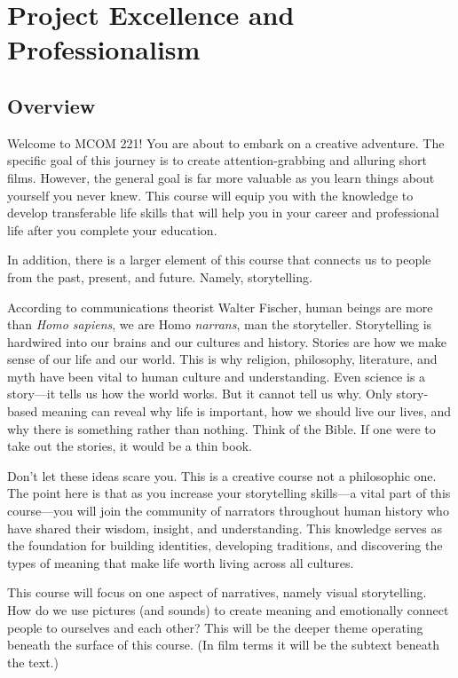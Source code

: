 \documentclass[
]{book}
\begin{document}
\hypertarget{project-excellence-and-professionalism}{%
\chapter{Project Excellence and Professionalism}\label{project-excellence-and-professionalism}}

\hypertarget{overview}{%
\section*{Overview}\label{overview}}

Welcome to MCOM 221! You are about to embark on a creative adventure. The specific goal of this journey is to create attention-grabbing and alluring short films. However, the general goal is far more valuable as you learn things about yourself you never knew. This course will equip you with the knowledge to develop transferable life skills that will help you in your career and professional life after you complete your education.

In addition, there is a larger element of this course that connects us to people from the past, present, and future. Namely, storytelling.

According to communications theorist Walter Fischer, human beings are more than \emph{Homo sapiens}, we are Homo \emph{narrans}, man the storyteller. Storytelling is hardwired into our brains and our cultures and history. Stories are how we make sense of our life and our world. This is why religion, philosophy, literature, and myth have been vital to human culture and understanding. Even science is a story---it tells us how the world works. But it cannot tell us why. Only story-based meaning can reveal why life is important, how we should live our lives, and why there is something rather than nothing. Think of the Bible. If one were to take out the stories, it would be a thin book.

Don't let these ideas scare you. This is a creative course not a philosophic one. The point here is that as you increase your storytelling skills---a vital part of this course---you will join the community of narrators throughout human history who have shared their wisdom, insight, and understanding. This knowledge serves as the foundation for building identities, developing traditions, and discovering the types of meaning that make life worth living across all cultures.

This course will focus on one aspect of narratives, namely visual storytelling. How do we use pictures (and sounds) to create meaning and emotionally connect people to ourselves and each other? This will be the deeper theme operating beneath the surface of this course. (In film terms it will be the subtext beneath the text.)
\end{document}
